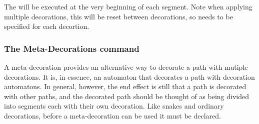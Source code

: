 \begin{command}{\pgfsetdecorationsegmenttransformation{}}
  The  will be executed at the very beginning of each
  segment. Note when applying multiple decorations, this will
  be reset between decorations, so needs to be specified for
  each decortion.

\begin{codeexample}[]
\end{codeexample}
  
\end{command}


\subsubsection{The Meta-Decorations command}
\label{section-base-meta-decorations}

A meta-decoration provides an alternative way to decorate a path with 
mutiple decorations. It is, in essence, an automaton that decorates
a path with decoration automatons. In general, however, the end effect 
is still that a path is decorated with other paths, and the decorated 
path should be thought of as being divided into segments each with 
their own decoration. Like snakes and ordinary decorations, before a 
meta-decoration can be used it must be declared.

